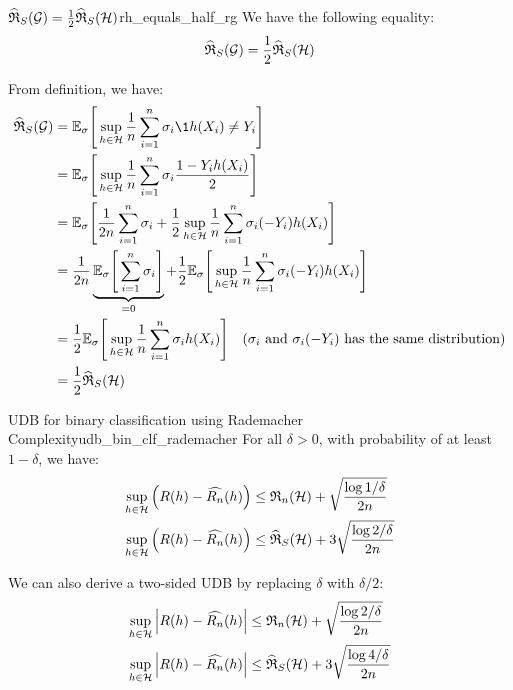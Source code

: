 \begin{lemma}{$\widehat{\mathfrak{R}}_S(\mathcal{G}) = \frac{1}{2}\widehat{\mathfrak{R}}_S(\mathcal{H})$}{rh_equals_half_rg}
    We have the following equality:
    \begin{align*}
        \widehat{\mathfrak{R}}_S(\mathcal{G}) = \frac{1}{2}\widehat{\mathfrak{R}}_S(\mathcal{H})
    \end{align*}
\end{lemma}

\begin{proof*}
    From definition, we have:
    \begin{align*}
        \ERC_S(\G) 
            &= \E_\sigma\biggSquare{
                \sup_{h\in\Hf} \frac{1}{n} \sum_{i=1}^n \sigma_i \1{h(X_i)\ne Y_i} 
            } \\
            &= \E_\sigma\biggSquare{
                \sup_{h\in\Hf} \frac{1}{n} \sum_{i=1}^n \sigma_i \frac{1-Y_ih(X_i)}{2} 
            } \\
            &= \E_\sigma\biggSquare{
                \frac{1}{2n}\sum_{i=1}^n \sigma_i + \frac{1}{2}\sup_{h\in \Hf}\frac{1}{n} \sum_{i=1}^n \sigma_i(-Y_i)h(X_i)
            } \\ 
            &= \frac{1}{2n} \underbrace{\E_\sigma\biggSquare{
                \sum_{i=1}^n \sigma_i
            }}_{=0} + \frac{1}{2}\E_\sigma\biggSquare{
                \sup_{h\in \Hf}\frac{1}{n} \sum_{i=1}^n \sigma_i(-Y_i)h(X_i)
            } \\
            &= \frac{1}{2}\E_\sigma\biggSquare{
                \sup_{h\in \Hf}\frac{1}{n} \sum_{i=1}^n \sigma_i h(X_i)
            } \ \ \ (\sigma_i \text{ and } \sigma_i(-Y_i) \text{ has the same distribution}) \\
            &= \frac{1}{2}\ERC_S(\Hf)
    \end{align*}
\end{proof*}

\begin{corollary}{UDB for binary classification using Rademacher Complexity}{udb_bin_clf_rademacher}
    For all $\delta>0$, with probability of at least $1-\delta$, we have:
    \begin{align*}
        \sup_{h\in\mathcal{H}} \Big( 
            R(h) - \widehat{R_n}(h)
         \Big) &\le \mathfrak{R}_n(\mathcal{H}) + \sqrt{
            \frac{\log 1/\delta}{2n}
        } \\
        \sup_{h\in\mathcal{H}} \Big( 
            R(h) - \widehat{R_n}(h)
         \Big) &\le \widehat{\mathfrak{R}}_S(\mathcal{H}) + 3\sqrt{
            \frac{\log 2/\delta}{2n}
        }
    \end{align*}

    \noindent We can also derive a two-sided UDB by replacing $\delta$ with $\delta/2$:
    \begin{align*}
        \sup_{h\in\mathcal{H}} \Big| 
            R(h) - \widehat{R_n}(h)
         \Big| &\le \mathfrak{R}_n(\mathcal{H}) + \sqrt{
            \frac{\log 2/\delta}{2n}
        } \\
        \sup_{h\in\mathcal{H}} \Big| 
            R(h) - \widehat{R_n}(h)
         \Big| &\le \widehat{\mathfrak{R}}_S(\mathcal{H}) + 3\sqrt{
            \frac{\log 4/\delta}{2n}
        }
    \end{align*}
\end{corollary}

